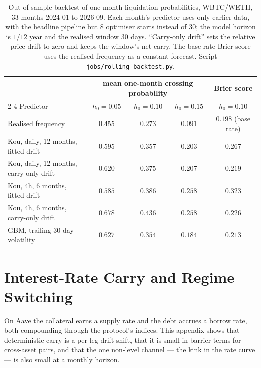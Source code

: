 \documentclass[11pt]{article}
\theoremstyle{plain}
\theoremstyle{definition}
\theoremstyle{remark}
\begin{document}
\begin{table}[ht]
\centering\small
\begin{tabular}{lcccc}
\toprule
 & \multicolumn{3}{c}{mean one-month crossing probability} & Brier score \\
\cmidrule(lr){2-4}
Predictor & $h_0=0.05$ & $h_0=0.10$ & $h_0=0.15$ & $h_0=0.10$ \\
\midrule
Realised frequency & $0.455$ & $0.273$ & $0.091$ & $0.198$ (base rate) \\
\midrule
Kou, daily, 12 months, fitted drift & $0.595$ & $0.357$ & $0.203$ & $0.267$ \\
Kou, daily, 12 months, carry-only drift & $0.620$ & $0.375$ & $0.207$ & $0.219$ \\
Kou, 4h, 6 months, fitted drift & $0.585$ & $0.386$ & $0.258$ & $0.323$ \\
Kou, 4h, 6 months, carry-only drift & $0.678$ & $0.436$ & $0.258$ & $0.226$ \\
GBM, trailing 30-day volatility & $0.627$ & $0.354$ & $0.184$ & $0.213$ \\
\bottomrule
\end{tabular}
\caption{Out-of-sample backtest of one-month liquidation probabilities, WBTC/WETH, $33$ months
2024-01 to 2026-09. Each month's predictor uses only earlier data, with the headline pipeline but
$8$ optimiser starts instead of $30$; the model horizon is $1/12$ year and the realised window $30$ days. ``Carry-only drift'' sets the
relative price drift to zero and keeps the window's net carry. The base-rate Brier score uses the
realised frequency as a constant forecast. Script \texttt{jobs/rolling\_backtest.py}.}
\label{tab:barrier}
\end{table}

\section{Interest-Rate Carry and Regime Switching}\label{app:carry}\label{sec:carry}

On Aave the collateral earns a supply rate and the debt accrues a borrow rate, both compounding
through the protocol's indices. This appendix shows that deterministic carry is a per-leg drift shift,
that it is small in barrier terms for cross-asset pairs, and that the one non-level channel --- the kink in the rate curve
--- is also small at a monthly horizon.
\end{document}
